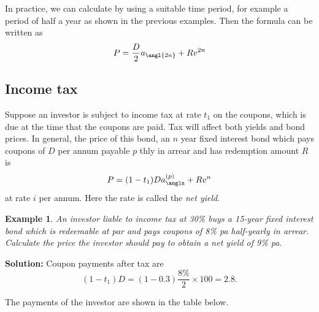 \documentclass[
]{book}
\theoremstyle{definition}
\theoremstyle{definition}
\newtheorem{example}{Example}[chapter]
\theoremstyle{definition}
\theoremstyle{definition}
\theoremstyle{remark}
\begin{document}
In practice, we can calculate by using a suitable time period, for
example a period of half a year as shown in the previous examples. Then
the formula can be written as
\[P = \frac{D}{2} a_{\angl{2n}} + R v^{2n}\]

\hypertarget{income-tax}{%
\subsection{Income tax}\label{income-tax}}

Suppose an investor is subject to income tax at rate \(t_1\) on the
coupons, which is due at the time that the coupons are paid. Tax will
affect both yields and bond prices. In general, the price of this bond,
an \(n\) year fixed interest bond which pays coupons of \(D\) per annum
payable \(p\) thly in arrear and has redemption amount \(R\) is
\[P = (1 - t_1) D a_{\angln}^{(p)} + R v^n\] at rate \(i\) per annum. Here
the rate is called the \emph{net yield}.

\begin{example}
\emph{An investor liable to income tax at 30\% buys a 15-year fixed interest
bond which is redeemable at par and pays coupons of 8\% pa half-yearly in
arrear. Calculate the price the investor should pay to obtain a net
yield of 9\% pa.}
\end{example}

\textbf{Solution:} Coupon payments after tax are
\[ (1 - t_1) D = (1 - 0.3) \frac{8\%}{2} \times 100 = 2.8.\]

The payments of the investor are shown in the table below.
\end{document}
